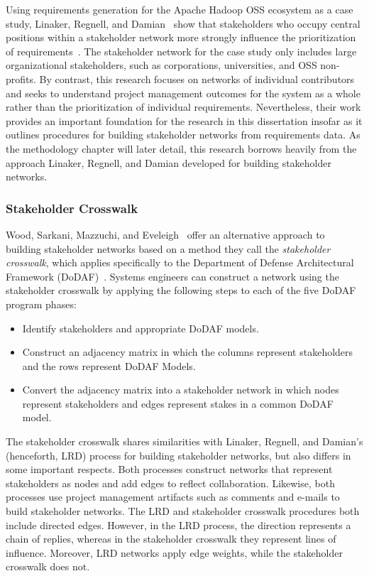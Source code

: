 Using requirements generation for the Apache Hadoop OSS ecosystem as a case study, Linaker, Regnell, and Damian~\cite{linaker} show that stakeholders who occupy central positions within a stakeholder network more strongly influence the prioritization of requirements~\cite{linaker}. The stakeholder network for the case study only includes large organizational stakeholders, such as corporations, universities, and OSS non-profits. By contrast, this research focuses on networks of individual contributors and seeks to understand project management outcomes for the system as a whole rather than the prioritization of individual requirements. Nevertheless, their work provides an important foundation for the research in this dissertation insofar as it outlines procedures for building stakeholder networks from requirements data. As the methodology chapter will later detail, this research borrows heavily from the approach Linaker, Regnell, and Damian developed for building stakeholder networks.

\subsubsection{Stakeholder Crosswalk}

Wood, Sarkani, Mazzuchi, and Eveleigh~\cite{wood} offer an alternative approach to building stakeholder networks based on a method they call the \emph{stakeholder crosswalk}, which applies specifically to the Department of Defense Architectural Framework (DoDAF)~\cite{dodaf}. Systems engineers can construct a network using the stakeholder crosswalk by applying the following steps to each of the five DoDAF program phases:

\begin{itemize}
    \item Identify stakeholders and appropriate DoDAF models.
    \item Construct an adjacency matrix in which the columns represent stakeholders and the rows represent DoDAF Models.
    \item Convert the adjacency matrix into a stakeholder network in which nodes represent stakeholders and edges represent stakes in a common DoDAF model. 
\end{itemize}

The stakeholder crosswalk shares similarities with Linaker, Regnell, and Damian's (henceforth, LRD) process for building stakeholder networks, but also differs in some important respects. Both processes construct networks that represent stakeholders as nodes and add edges to reflect collaboration. Likewise, both processes use project management artifacts such as comments and e-mails to build stakeholder networks. The LRD and stakeholder crosswalk procedures both include directed edges. However, in the LRD process, the direction represents a chain of replies, whereas in the stakeholder crosswalk they represent lines of influence. Moreover, LRD networks apply edge weights, while the stakeholder crosswalk does not.

